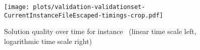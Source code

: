 \begin{figure}[hbtp]
   \centering
   \texttt{[image: plots/validation-validationset-\\CurrentInstanceFileEscaped-timings-crop.pdf]}
   \caption[Solution quality over time for instance \CurrentInstance]{Solution quality over time for instance \CurrentInstance\ (linear time scale left, logarithmic time scale right)}
   \label{fig:\CurrentInstanceFileEscaped-ts}
\end{figure}

